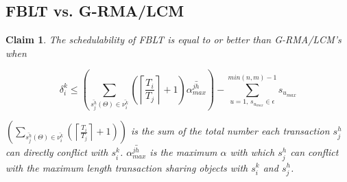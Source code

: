 \documentclass[a4paper,english]{article}
\newtheorem{clm}{Claim}
\begin{document}
\subsection{FBLT vs. G-RMA/LCM}

\begin{clm}\label{clm:fblt_lcm_rma}
The schedulability of FBLT is equal to or better than G-RMA/LCM's when 

\[
\delta_i^k\le\left(\sum_{\bar{s_{j}^{h}}(\Theta)\in \bar{\nu_{i}^{k}}}\left(\left\lceil \frac{T_{i}}{T_{j}}\right\rceil +1\right)\bar{\alpha_{max}^{jh}}\right)-\sum_{u=1,\,s_{u_{max}}\in \epsilon}^{min(n,m)-1} s_{u_{max}}\label{eq:fblt_lcm_rma_comparison_7_mod}
\]

$\left(\sum_{\bar{s_{j}^{h}}(\Theta) \in \bar{\nu_{i}^{k}}}\left(\left\lceil \frac{T_{i}}{T_{j}}\right\rceil +1\right)\right)$ is the sum of the total number each transaction $s_j^h$ can directly conflict with $s_i^k$. $\bar{\alpha_{max}^{jh}}$ is the maximum $\alpha$ with which $s_j^h$ can conflict with the maximum length transaction sharing objects with $s_i^k$ and $s_j^h$. 

\end{clm}
\end{document}
